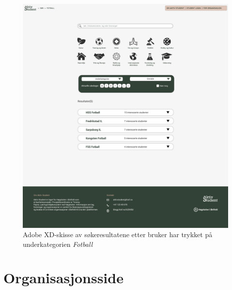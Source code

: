 \begin{figure}[H]
\centering
\includegraphics[width=\textwidth]{Illustrasjoner/Skisser-pdf/3.0/3-3-resultater-fotball.pdf}
\caption{Adobe XD-skisse av søkeresultatene etter bruker har trykket på underkategorien {\em Fotball}}
\label{vedlegg:3-3-resultater-filtrering}
\end{figure}

\section{Organisasjonsside}

